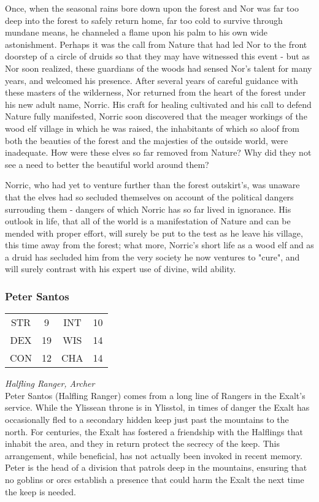Once, when the seasonal rains bore down upon the forest and Nor was far too deep into the forest to safely return home, far too cold to survive through mundane means, he channeled a flame upon his palm to his own wide astonishment. Perhaps it was the call from Nature that had led Nor to the front doorstep of a circle of druids so that they may have witnessed this event - but as Nor soon realized, these guardians of the woods had sensed Nor's talent for many years, and welcomed his presence. After several years of careful guidance with these masters of the wilderness, Nor returned from the heart of the forest under his new adult name, Norric. His craft for healing cultivated and his call to defend Nature fully manifested, Norric soon discovered that the meager workings of the wood elf village in which he was raised, the inhabitants of which so aloof from both the beauties of the forest and the majesties of the outside world, were inadequate. How were these elves so far removed from Nature? Why did they not see a need to better the beautiful world around them? 

Norric, who had yet to venture further than the forest outskirt's, was unaware that the elves had so secluded themselves on account of the political dangers surrouding them - dangers of which Norric has so far lived in ignorance. His outlook in life, that all of the world is a manifestation of Nature and can be mended with proper effort, will surely be put to the test as he leave his village, this time away from the forest; what more, Norric's short life as a wood elf and as a druid has secluded him from the very society he now ventures to "cure", and will surely contrast with his expert use of divine, wild ability.

\subsubsection{Peter Santos}
\begin{center}
\begin{tabular}{c c|c c}
STR & 9 & INT & 10\\
DEX & 19 & WIS & 14 \\
CON & 12 & CHA & 14 \end{tabular}\end{center}
\textit{Halfling Ranger, Archer}\\

Peter Santos (Halfling Ranger) comes from a long line of Rangers in the Exalt's service. While the Ylissean throne is in Ylisstol, in times of danger the Exalt has occasionally fled to a secondary hidden keep just past the mountains to the north. For centuries, the Exalt has fostered a friendship with the Halflings that inhabit the area, and they in return protect the secrecy of the keep. This arrangement, while beneficial, has not actually been invoked in recent memory. Peter is the head of a division that patrols deep in the mountains, ensuring that no goblins or orcs establish a presence that could harm the Exalt the next time the keep is needed.

